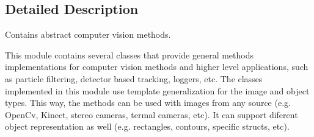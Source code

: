 \subsection{Detailed Description}
Contains abstract computer vision methods. 

This module contains several classes that provide general methods implementations for computer vision methods and higher level applications, such as particle filtering, detector based tracking, loggers, etc. The classes implemented in this module use template generalization for the image and object types. This way, the methods can be used with images from any source (e.\+g. Open\+Cv, Kinect, stereo cameras, termal cameras, etc). It can support diferent object representation as well (e.\+g. rectangles, contours, specific structs, etc). 
